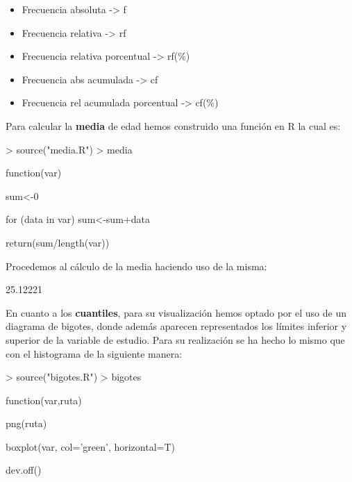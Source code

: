 \documentclass [a4paper] {article}
\begin{document}
\begin{itemize}
\item Frecuencia absoluta -> f
\item Frecuencia relativa -> rf
\item Frecuencia relativa porcentual -> rf(\%)
\item Frecuencia abs acumulada -> cf
\item Frecuencia rel acumulada porcentual -> cf(\%)
\end{itemize}

\bigskip
Para calcular la \textbf{media} de edad hemos construido una funci\'on en R la cual es:
\begin{Schunk}
\begin{Sinput}
> source("media.R")
> media
\end{Sinput}
\begin{Soutput}
function(var) {
    sum<-0

    for (data in var) {
        sum<-sum+data
    }

    return(sum/length(var))
}
\end{Soutput}
\end{Schunk}

\bigskip
Procedemos al c\'alculo de la media haciendo uso de la misma:
\begin{Schunk}
\begin{Soutput}
[1] 25.12221
\end{Soutput}
\end{Schunk}

\bigskip
En cuanto a los \textbf{cuantiles}, para su visualizaci\'on hemos optado por el uso
de un diagrama de bigotes, donde adem\'as aparecen representados los l\'imites inferior
y superior de la variable de estudio. Para su realizaci\'on se ha hecho lo mismo que con el 
histograma de la siguiente manera:
\begin{Schunk}
\begin{Sinput}
> source("bigotes.R")
> bigotes
\end{Sinput}
\begin{Soutput}
function(var,ruta) {
    png(ruta)
 
    boxplot(var, col='green', horizontal=T) 

    dev.off()
}
\end{Soutput}
\end{Schunk}
\end{document}
